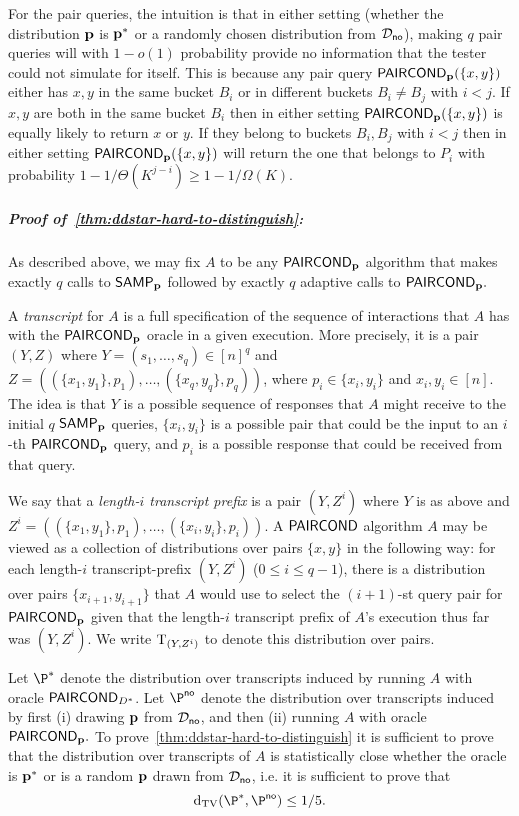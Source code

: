 For the pair queries, the intuition is that in either setting
(whether the distribution $\mathbf{p}$ is $\mathbf{p}^\ast$ or a randomly
chosen distribution from $\mathcal{D}_{\textsf{no}}$),
making $q$ pair queries
will with $1-o(1)$ probability provide no information
that the tester could not simulate for itself.  This is because
any pair query ${\sf PAIRCOND}_{\mathbf{p}}(\{x,y\})$ either has $x,y$ in the same
bucket $B_i$ or in different buckets $B_i \neq B_j$ with $i < j.$
If $x,y$ are both in the same bucket $B_i$ then in either setting
${\sf PAIRCOND}_{\mathbf{p}}(\{x,y\})$ is equally likely to return $x$ or $y$.
If they belong to buckets $B_i,B_j$ with $i<j$ then in
either setting ${\sf PAIRCOND}_{\mathbf{p}}(\{x,y\})$ will return the
one that belongs to $P_i$ with probability
$1 - 1/\Theta(K^{j-i}) \geq 1 - 1/\Omega(K).$

\subparagraph{Proof of~\cref{thm:ddstar-hard-to-distinguish}:}
As described above, we may fix $A$ to be any ${\sf PAIRCOND}_{\mathbf{p}}$
algorithm that makes exactly $q$ calls to ${\sf SAMP}_{\mathbf{p}}$
followed by
exactly $q$ adaptive calls to ${\sf PAIRCOND}_{\mathbf{p}}.$

A \emph{transcript} for $A$ is a full specification of the sequence
of interactions that $A$ has with the
${\sf PAIRCOND}_{\mathbf{p}}$ oracle in a given execution. More precisely,
it is a pair $(Y,Z)$ where $Y=(s_1,\dots,s_q) \in [n]^q$ and
$Z=((\{x_1,y_1\},p_1),\dots,(\{x_q,y_q\},p_q))$, where $p_i \in \{x_i,y_i\}$
and $x_i,y_i \in [n].$
The idea is that $Y$ is a possible
sequence of responses that $A$ might receive
to the initial $q$ ${\sf SAMP}_{\mathbf{p}}$ queries, $\{x_i,y_i\}$ is a possible
pair that could be the input to an $i$-th ${\sf PAIRCOND}_{\mathbf{p}}$ query,
and $p_i$ is a possible response that could be received from that query.

We say that a \emph{length-$i$ transcript prefix} is a
pair $(Y,Z^i)$ where $Y$ is as above and $Z^i=((\{x_1,y_1\},p_1),\dots,
(\{x_i,y_i\},p_i))$.
A ${\sf PAIRCOND}$ algorithm $A$ may be viewed as a collection of distributions
over pairs $\{x,y\}$ in the following way:  for each
length-$i$ transcript-prefix $(Y,Z^i)$ ($0 \leq i \leq q-1$),
there is a distribution over pairs
$\{x_{i+1},y_{i+1}\}$ that $A$ would use to select the
$(i+1)$-st query pair for ${\sf PAIRCOND}_{\mathbf{p}}$ given that the
length-$i$ transcript prefix of $A$'s execution thus far was $(Y,Z^i)$.
We write ${\rm T}_{(Y,Z^i)}$ to denote this distribution over pairs.

Let $\P^\ast$ denote the distribution over
transcripts induced by running $A$ with oracle
${\sf PAIRCOND}_{D^\ast}$.
Let $\P^{\text \no}$ denote the distribution
over transcripts induced by first (i) drawing $\mathbf{p}$
from $\mathcal{D}_{\textsf{no}}$, and then (ii) running $A$ with
oracle ${\sf PAIRCOND}_{\mathbf{p}}.$
To prove~\cref{thm:ddstar-hard-to-distinguish} it is sufficient
to prove that the distribution  over transcripts of $A$ is statistically close
whether the oracle is $\mathbf{p}^\ast$ or is a random $\mathbf{p}$ drawn from
$\mathcal{D}_{\textsf{no}}$, i.e. it is sufficient to prove that
\begin{equation} \label{eq:close}
\dtv(\P^\ast,\P^{\text \no}) \leq 1/5.
\end{equation}

